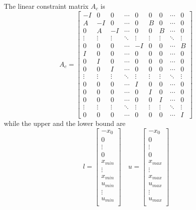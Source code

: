 The linear constraint matrix $A_c$ is \[ A_c = \left[ \begin{array}{ccccc|cccc} -I & 0 & 0 & \cdots & 0 & 0 & 0 & \cdots & 0\\ A & -I & 0 & \cdots & 0 & B & 0 & \cdots & 0 \\ 0 & A & -I & \cdots & 0 & 0 & B & \cdots & 0\\ \vdots & \vdots & \vdots & \ddots & \vdots & \vdots & \vdots & \ddots & \vdots \\ 0 & 0 & 0 & \cdots & -I & 0 & 0 & \cdots & B\\ \hline I & 0 & 0 & \cdots & 0 & 0 & 0 & \cdots & 0\\ 0 & I & 0 & \cdots & 0 & 0 & 0 & \cdots & 0\\ 0 & 0 & I & \cdots & 0 & 0 & 0 & \cdots & 0\\ \vdots & \vdots & \vdots & \ddots & \vdots & \vdots & \vdots & \ddots & \vdots \\ 0 & 0 & 0 & \cdots & I & 0 & 0 & \cdots & 0\\ 0 & 0 & 0 & \cdots & 0 & I & 0 & \cdots & 0\\ 0 & 0 & 0 & \cdots & 0 & 0 & I & \cdots & 0\\ \vdots & \vdots & \vdots & \ddots & \vdots & \vdots & \vdots & \ddots & \vdots \\ 0 & 0 & 0 & \cdots & 0 & 0 & 0 & \cdots & I \end{array} \right] \] while the upper and the lower bound are \[ l = \begin{bmatrix} -x_0 \\ 0 \\ \vdots \\ 0 \\ x_{min}\\ \vdots\\ x_{min}\\ u_{min}\\ \vdots\\ u_{min}\\ \end{bmatrix} \quad u = \begin{bmatrix} -x_0 \\ 0 \\ \vdots \\ 0 \\ x_{max}\\ \vdots\\ x_{max}\\ u_{max}\\ \vdots\\ u_{max}\\ \end{bmatrix} \]

